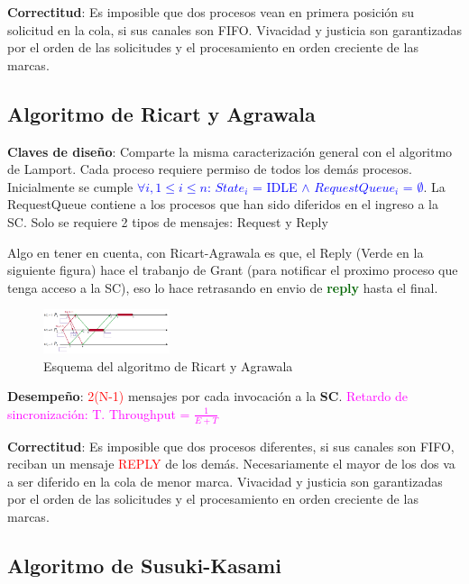 \textbf{Correctitud}: Es imposible que dos procesos vean en primera posición su solicitud en la cola, si sus canales son FIFO. Vivacidad y justicia son garantizadas por el orden de las solicitudes y el procesamiento en orden creciente de las marcas.

\subsection{Algoritmo de Ricart y Agrawala}

\textbf{Claves de diseño}: Comparte la misma caracterización general con el algoritmo de Lamport. Cada proceso requiere permiso de todos los demás procesos. Inicialmente se cumple \textcolor{blue}{$\forall i, 1 \leq i \leq n$: $State_i$ = IDLE $\wedge$ $RequestQueue_i$ = $\emptyset$}. La RequestQueue contiene a los procesos que han sido diferidos en el ingreso a la SC. Solo se requiere 2 tipos de mensajes: Request y Reply

Algo en tener en cuenta, con Ricart-Agrawala es que, el Reply (Verde en la siguiente figura) hace el trabanjo de Grant (para notificar el proximo proceso que tenga acceso a la SC), eso lo hace retrasando en envio de \textcolor{darkgreen}{\textbf{reply}} hasta el final.
\begin{figure}[H]
    \centering
    \includegraphics[width=0.33\textwidth]{img/A_Ricart_Agrawala.png}
    \caption{Esquema del algoritmo de Ricart y Agrawala}
\end{figure}

\textbf{Desempeño}: \textcolor{red}{2(N-1)} mensajes por cada invocación a la \textbf{SC}.  \textcolor{magenta}{Retardo de sincronización: T. Throughput = $\frac{1}{E+T}$}

\textbf{Correctitud}: Es imposible que dos procesos diferentes, si sus canales son FIFO, reciban un mensaje \textcolor{red}{REPLY} de los demás. Necesariamente el mayor de los dos va a ser diferido en la cola de menor marca. Vivacidad y justicia son garantizadas por el orden de las solicitudes y el procesamiento en orden creciente de las marcas.

\subsection{Algoritmo de Susuki-Kasami}

